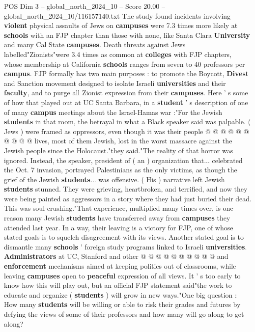 \begin{textsample}{POS Dim 3 – global\_north\_2024\_10 – Score 20.00 – global\_north\_2024\_10/116157140.txt}
The study found incidents involving \textbf{violent} physical assaults of Jews on \textbf{campuses} were 7.3 times more likely at \textbf{schools} with an FJP chapter than those with none, like Santa Clara \textbf{University} and many Cal State \textbf{campuses}.
Death threats against Jews labelled"Zionists"were 3.4 times as common at \textbf{colleges} with FJP chapters, whose membership at California \textbf{schools} ranges from seven to 40 professors per \textbf{campus}.
FJP formally has two main purposes : to promote the Boycott, \textbf{Divest} and Sanction movement designed to isolate Israeli \textbf{universities} and their \textbf{faculty}, and to purge all Zionist expression from their \textbf{campuses}.
Here ' s some of how that played out at UC Santa Barbara, in a \textbf{student} ' s description of one of many \textbf{campus} meetings about the Israel-Hamas war :"For the Jewish \textbf{students} in that room, the betrayal in what a Black speaker said was palpable. ( Jews ) were framed as oppressors, even though it was their people @ @ @ @ @ @ @ @ @ @ lives, most of them Jewish, lost in the worst massacre against the Jewish people since the Holocaust."they said."The reality of that horror was ignored.
Instead, the speaker, president of ( an ) organization that... celebrated the Oct. 7 invasion, portrayed Palestinians as the only victims, as though the grief of the Jewish \textbf{students}... was offensive. ( His ) narrative left Jewish \textbf{students} stunned.
They were grieving, heartbroken, and terrified, and now they were being painted as aggressors in a story where they had just buried their dead.
This was soul-crushing."That experience, multiplied many times over, is one reason many Jewish \textbf{students} have transferred away from \textbf{campuses} they attended last year.
In a way, their leaving is a victory for FJP, one of whose stated goals is to squelch disagreement with its views.
Another stated goal is to dismantle many \textbf{schools} ' foreign study programs linked to Israeli \textbf{universities}. \textbf{Administrators} at UC, Stanford and other @ @ @ @ @ @ @ @ @ @ and \textbf{enforcement} mechanisms aimed at keeping politics out of classrooms, while leaving \textbf{campuses} open to \textbf{peaceful} expression of all views.
It ' s too early to know how this will play out, but an official FJP statement said"the work to educate and organize ( \textbf{students} ) will grow in new ways."One big question : How many \textbf{students} will be willing or able to risk their grades and futures by defying the views of some of their professors and how many will go along to get along?

\end{textsample}
